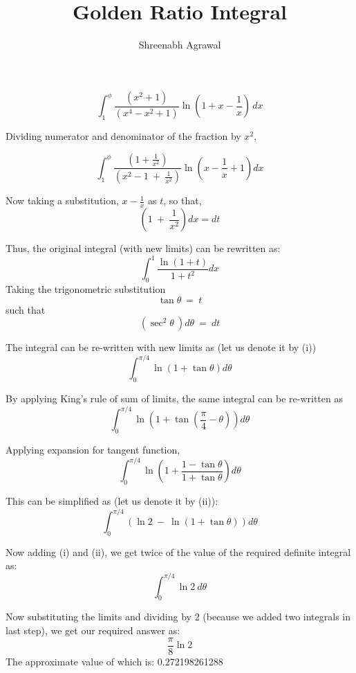 \documentclass{article}
\title{Golden Ratio Integral}
\author{Shreenabh Agrawal}
\begin{document}
\date{}
\renewcommand{\familydefault}{\rmdefault}

$$\int_{1}^{\phi}\frac{\left(x^{2}+1\right)}{\left(x^{4}-x^{2}+1\right)}\ln\left(1+x-\frac{1}{x}\right)\,dx$$

Dividing numerator and denominator of the fraction by $x^{2},$

$$\int_{1}^{\phi}\frac{\left(1+\frac{1}{x^{2}}\right)}{\left(x^{2}-1\ +\ \frac{1}{x^{2}}\right)}\ln\left(x-\frac{1}{x}+1\right)dx$$

Now taking a substitution, $x-\frac{1}{x}$ as $t$,
so that, $$\left(1\ +\ \frac{1}{x^{2}}\right)dx=dt$$

Thus, the original integral (with new limits) can be rewritten as:
$$\int_{0}^{1}\frac{\ln\left(1+t\right)}{1+t^{2}}dx$$
Taking the trigonometric substitution $$ \tan\theta\ =\ t $$
such that $$\left(\sec^{2}\theta\ \right)d\theta\ =\ dt$$

The integral can be re-written with new limits as (let us denote it by (i))
$$\int_{0}^{\pi/4}\ln\left(1+\tan\theta\right)d\theta$$

By applying King's rule of sum of limits, the same integral can be re-written as
$$\int_{0}^{\pi/4}\ln\left(1+\tan\left(\frac{\pi}{4}-\theta\right)\right)d\theta$$

Applying expansion for tangent function,
$$\int_{0}^{\pi/4}\ln\left(1+\frac{1-\tan\theta}{1+\tan\theta}\right)d\theta $$

This can be simplified as (let us denote it by (ii)):
$$\int_{0}^{\pi/4}\left(\ln2\ -\ \ln\left(1+\tan\theta\right)\right)d\theta$$

Now adding (i) and (ii), we get twice of the value of the required definite integral as:
$$\int_{0}^{\pi/4}\ln2\ d\theta$$

Now substituting the limits and dividing by 2 (because we added two integrals in last step), we get our required answer as:
$$\frac{\pi}{8}\ln2$$
The approximate value of which is:
0.272198261288
\end{document}
